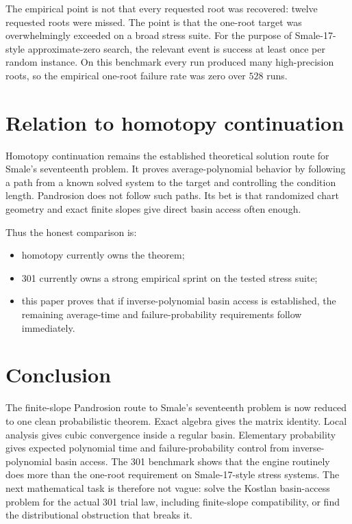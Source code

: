 \documentclass[11pt]{article}
\begin{document}
The empirical point is not that every requested root was recovered: twelve requested roots were missed.  The point is that the one-root target was overwhelmingly exceeded on a broad stress suite.  For the purpose of Smale-17-style approximate-zero search, the relevant event is success at least once per random instance.  On this benchmark every run produced many high-precision roots, so the empirical one-root failure rate was zero over $528$ runs.

\section{Relation to homotopy continuation}

Homotopy continuation remains the established theoretical solution route for Smale's seventeenth problem.  It proves average-polynomial behavior by following a path from a known solved system to the target and controlling the condition length.  Pandrosion does not follow such paths.  Its bet is that randomized chart geometry and exact finite slopes give direct basin access often enough.

Thus the honest comparison is:
\begin{itemize}
\item homotopy currently owns the theorem;
\item 301 currently owns a strong empirical sprint on the tested stress suite;
\item this paper proves that if inverse-polynomial basin access is established, the remaining average-time and failure-probability requirements follow immediately.
\end{itemize}

\section{Conclusion}

The finite-slope Pandrosion route to Smale's seventeenth problem is now reduced to one clean probabilistic theorem.  Exact algebra gives the matrix identity.  Local analysis gives cubic convergence inside a regular basin.  Elementary probability gives expected polynomial time and failure-probability control from inverse-polynomial basin access.  The 301 benchmark shows that the engine routinely does more than the one-root requirement on Smale-17-style stress systems.  The next mathematical task is therefore not vague: solve the Kostlan basin-access problem for the actual 301 trial law, including finite-slope compatibility, or find the distributional obstruction that breaks it.
\end{document}
